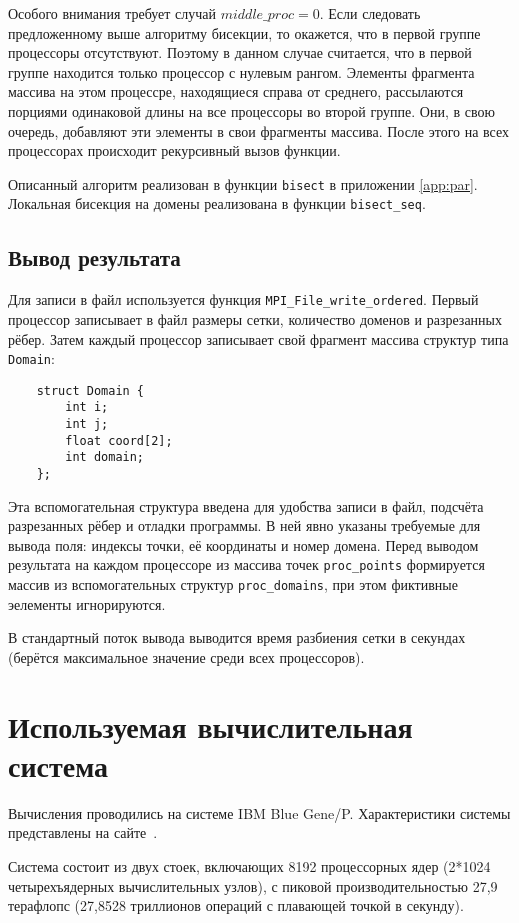 \documentclass[oneside,final,14pt]{extreport}
\begin{document}
Особого внимания требует случай $middle\_proc = 0$. Если следовать
предложенному выше алгоритму бисекции, то окажется, что
в первой группе процессоры отсутствуют. Поэтому в данном случае считается,
что в первой группе находится только процессор с нулевым рангом.
Элементы фрагмента массива на этом процессре, находящиеся справа от среднего,
рассылаются порциями одинаковой длины на все процессоры во второй группе.
Они, в свою очередь, добавляют эти элементы в свои фрагменты массива.
После этого на всех процессорах происходит рекурсивный вызов функции.

Описанный алгоритм реализован в функции \texttt{bisect} в приложении
\ref{app:par}. Локальная бисекция на домены реализована в функции
\texttt{bisect\_seq}.

\section*{Вывод результата}

Для записи в файл используется функция \texttt{MPI\_File\_write\_ordered}.
Первый процессор записывает в файл размеры сетки, количество доменов и
разрезанных рёбер. Затем каждый процессор записывает свой фрагмент массива
структур типа \texttt{Domain}:
\begin{verbatim}
    struct Domain {
        int i;
        int j;
        float coord[2];
        int domain;
    };
\end{verbatim}
Эта вспомогательная структура введена для
удобства записи в файл, подсчёта разрезанных рёбер и отладки программы. В ней явно указаны требуемые для
вывода поля: индексы точки, её координаты и номер домена. Перед выводом
результата на каждом процессоре из массива точек \texttt{proc\_points}
формируется массив из вспомогательных структур \texttt{proc\_domains}, при этом
фиктивные эелементы игнорируются.

В стандартный поток вывода выводится время разбиения сетки в секундах
(берётся максимальное значение среди всех процессоров).

\chapter*{Используемая вычислительная система}

Вычисления проводились на системе IBM Blue Gene/P.
Характеристики системы представлены на сайте~\cite{bluegene}.

Система состоит из двух стоек, включающих 8192 процессорных ядер
(2*1024 четырехъядерных вычислительных узлов), с пиковой производительностью
27,9 терафлопс (27,8528 триллионов операций с плавающей точкой в секунду).
\end{document}
